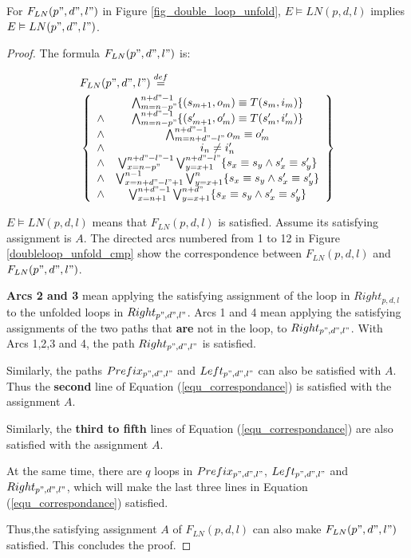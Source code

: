 \documentclass[journal]{IEEEtran}
\begin{document}
\begin{lemma}[]\label{lemma_unfold_longer}
For $F_{LN}(p",d",l")$ in Figure \ref{fig_double_loop_unfold},
$E\vDash LN(p,d,l)$ implies $E\vDash LN(p",d",l")$.
\end{lemma}
\begin{proof}
The formula $F_{LN}(p",d",l")$ is:

\begin{equation}\label{equ_correspondance}
\begin{split}
&F_{LN}(p",d",l")\stackrel{def}{=}\\
&\left\{
\begin{array}{cc}
&\bigwedge_{m=n-p"}^{n+d"-1}
\{
(s_{m+1},o_m)\equiv T(s_m,i_m)
\}
\\
\wedge&\bigwedge_{m=n-p"}^{n+d"-1}
\{
(s'_{m+1},o'_m)\equiv T(s'_m,i'_m)
\}
\\
\wedge&\bigwedge_{m=n+d"-l"}^{n+d"-1}o_m\equiv o'_m \\
\wedge& i_n\ne i'_n \\
\wedge& \bigvee_{x=n-p"}^{n+d"-l"-1}\bigvee_{y=x+1}^{n+d"-l"} \{s_x\equiv s_y\wedge s'_x\equiv s'_y\} \\
\wedge& \bigvee_{x=n+d"-l"+1}^{n-1}\bigvee_{y=x+1}^{n} \{s_x\equiv s_y\wedge s'_x\equiv s'_y\} \\
\wedge& \bigvee_{x=n+1}^{n+d"-1}\bigvee_{y=x+1}^{n+d"} \{s_x\equiv s_y\wedge s'_x\equiv s'_y\}
\end{array}
\right\}
\end{split}
\end{equation}

$E\vDash LN(p,d,l)$ means that $F_{LN}(p,d,l)$ is satisfied.
Assume its satisfying assignment is $A$.
The directed arcs numbered from 1 to 12 in Figure \ref{doubleloop_unfold_cmp}
show the correspondence between $F_{LN}(p,d,l)$ and $F_{LN}(p",d",l")$.

\textbf{Arcs 2 and 3} mean applying the satisfying assignment of the loop in $Right_{p,d,l}$
to the unfolded loops in $Right_{p",d",l"}$.
Arcs 1 and 4 mean applying the satisfying assignments of the two paths that \textbf{are} not in the loop,
to $Right_{p",d",l"}$.
With Arcs 1,2,3 and 4,
the path $Right_{p",d",l"}$ is satisfied.

Similarly,
the paths $Prefix_{p",d",l"}$ and $Left_{p",d",l"}$ can also be satisfied with $A$.
Thus the \textbf{second} line of Equation (\ref{equ_correspondance}) is satisfied with the assignment $A$.

Similarly,
the \textbf{third to fifth} lines of Equation (\ref{equ_correspondance}) are also satisfied with the assignment $A$.

At the same time,
there are $q$ loops in $Prefix_{p",d",l"}$, $Left_{p",d",l"}$ and $Right_{p",d",l"}$,
which will make the last three lines in Equation (\ref{equ_correspondance}) satisfied.

Thus,the satisfying assignment $A$ of $F_{LN}(p,d,l)$ can also make $F_{LN}(p",d",l")$ satisfied.
This concludes the proof.
\end{proof}
\end{document}
